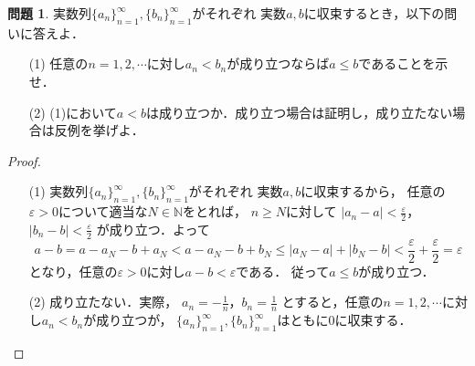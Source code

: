 \documentclass{jsarticle}
\theoremstyle{definition}
\newtheorem{qst}{問題}
\begin{document}
\begin{qst}
実数列$\{a_n\}_{n=1}^\infty,\{b_n\}_{n=1}^\infty$がそれぞれ
実数$a,b$に収束するとき，以下の問いに答えよ．
\begin{itemize}
\item[(1)]任意の$n=1,2,\cdots$に対し$a_n<b_n$が成り立つならば$a\leq b$であることを示せ．
\item[(2)](1)において$a<b$は成り立つか．成り立つ場合は証明し，成り立たない場合は反例を挙げよ．
\end{itemize}
\end{qst}
\begin{proof}
\begin{itemize}
\item[(1)]
実数列$\{a_n\}_{n=1}^\infty,\{b_n\}_{n=1}^\infty$がそれぞれ
実数$a,b$に収束するから，
任意の$\varepsilon>0$について適当な$N\in\mathbb{N}$をとれば，
$n\geq N$に対して
$|a_n-a|<\frac{\varepsilon}{2}$，$|b_n-b|<\frac{\varepsilon}{2}$
が成り立つ．よって
\[
a-b=a-a_N-b+a_N<a-a_N-b+b_N\leq|a_N-a|+|b_N-b|<
\frac{\varepsilon}{2}+\frac{\varepsilon}{2}=\varepsilon
\]
となり，任意の$\varepsilon>0$に対し$a-b<\varepsilon$である．
従って$a\leq b$が成り立つ．
\item[(2)]
成り立たない．実際，
$a_n=-\frac{1}{n}$，$b_n=\frac{1}{n}$
とすると，任意の$n=1,2,\cdots$に対し$a_n<b_n$が成り立つが，
$\{a_n\}_{n=1}^\infty,\{b_n\}_{n=1}^\infty$はともに0に収束する．
\end{itemize}
\end{proof}
\end{document}
